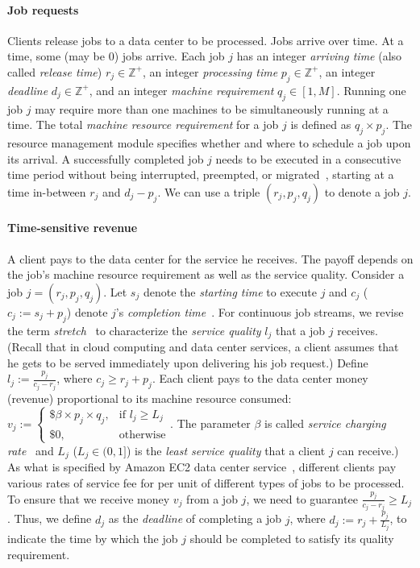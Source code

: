\documentclass[conference]{IEEEtran}
\begin{document}
\paragraph*{Job requests}

Clients release jobs to a data center to be processed. Jobs arrive over time. At a time, some (may be $0$) jobs arrive. Each job $j$ has an integer \emph{arriving time} (also called \emph{release time}) $r_j \in \mathbb{Z}^+$, an integer \emph{processing time} $p_j \in \mathbb{Z}^+$, an integer \emph{deadline} $d_j \in \mathbb{Z}^+$, and an integer \emph{machine requirement} $q_j \in [1, M]$. Running one job $j$ may require more than one machines to be simultaneously running at a time. The total \emph{machine resource requirement} for a job $j$ is defined as $q_j \times p_j$. The resource management module specifies whether and where to schedule a job upon its arrival. A successfully completed job $j$ needs to be executed in a consecutive time period without being interrupted, preempted, or migrated~\cite{GoiriL11}, starting at a time in-between $r_j$ and $d_j - p_j$. We can use a triple $(r_j, p_j, q_j)$ to denote a job $j$.

\paragraph*{Time-sensitive revenue}

A client pays to the data center for the service he receives. The payoff depends on the job's machine resource requirement as well as the service quality. Consider a job $j = (r_j, p_j, q_j)$. Let $s_j$ denote the \emph{starting time} to execute $j$ and $c_j$ ($c_j := s_j + p_j$) denote $j$'s \emph{completion time}~\cite{KargerWS10}. For continuous job streams, we revise the term \emph{stretch}~\cite{BenderCM98, BenderMR02} to characterize the \emph{service quality} $l_j$ that a job $j$ receives. (Recall that in cloud computing and data center services, a client assumes that he gets to be served immediately upon delivering his job request.) Define $l_j := \frac{p_j}{c_j - r_j}$, where $c_j \ge r_j + p_j$. Each client pays to the data center money (revenue) proportional to its machine resource consumed: $v_j :=
\begin{cases}
\$\beta \times p_j \times q_j, & \mbox{if } l_j \ge L_j\\
\$0, & \mbox{otherwise}
\end{cases}
$. The parameter $\beta$ is called \emph{service charging rate}~\cite{amazonprice} and $L_j$ ($L_j \in (0, 1]$) is the \emph{least service quality} that a client $j$ can receive.) As what is specified by Amazon EC2 data center service~\cite{amazonprice}, different clients pay various rates of service fee for per unit of different types of jobs to be processed. To ensure that we receive money $v_j$ from a job $j$, we need to guarantee $\frac{p_j}{c_j - r_j} \ge L_j$. Thus, we define $d_j$ as the \emph{deadline} of completing a job $j$, where $d_j := r_j + \frac{p_j}{L_j}$, to indicate the time by which the job $j$ should be completed to satisfy its quality requirement.
\end{document}
